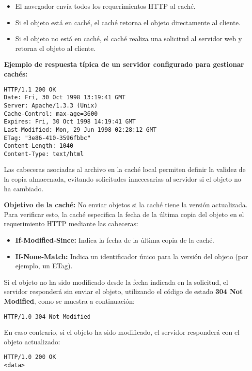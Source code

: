 \documentclass[a4paper,12pt]{article}
\begin{document}
\begin{itemize}
    \item El navegador envía todos los requerimientos HTTP al caché.
    \item Si el objeto está en caché, el caché retorna el objeto directamente al cliente.
    \item Si el objeto no está en caché, el caché realiza una solicitud al servidor web y retorna el objeto al cliente.
\end{itemize}

\textbf{Ejemplo de respuesta típica de un servidor configurado para gestionar cachés:}

\begin{verbatim}
HTTP/1.1 200 OK
Date: Fri, 30 Oct 1998 13:19:41 GMT
Server: Apache/1.3.3 (Unix)
Cache-Control: max-age=3600
Expires: Fri, 30 Oct 1998 14:19:41 GMT
Last-Modified: Mon, 29 Jun 1998 02:28:12 GMT
ETag: "3e86-410-3596fbbc"
Content-Length: 1040
Content-Type: text/html
\end{verbatim}

Las cabeceras asociadas al archivo en la caché local permiten definir la validez de la copia almacenada, evitando solicitudes innecesarias al servidor si el objeto no ha cambiado.

\textbf{Objetivo de la caché:} No enviar objetos si la caché tiene la versión actualizada. Para verificar esto, la caché especifica la fecha de la última copia del objeto en el requerimiento HTTP mediante las cabeceras:

\begin{itemize}
    \item \textbf{If-Modified-Since:} Indica la fecha de la última copia de la caché.
    \item \textbf{If-None-Match:} Indica un identificador único para la versión del objeto (por ejemplo, un ETag).
\end{itemize}

Si el objeto no ha sido modificado desde la fecha indicada en la solicitud, el servidor responderá sin enviar el objeto, utilizando el código de estado \textbf{304 Not Modified}, como se muestra a continuación:

\begin{verbatim}
HTTP/1.0 304 Not Modified
\end{verbatim}

En caso contrario, si el objeto ha sido modificado, el servidor responderá con el objeto actualizado:

\begin{verbatim}
HTTP/1.0 200 OK
<data>
\end{verbatim}
\end{document}
